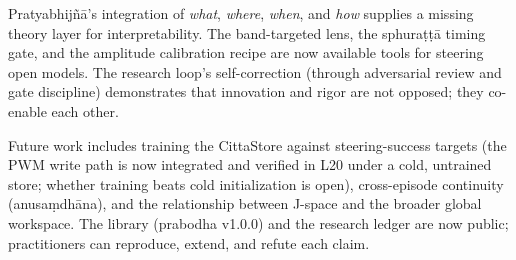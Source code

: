 Pratyabhij\~n\=a's integration of \emph{what}, \emph{where}, \emph{when}, and \emph{how} supplies a missing theory layer
for interpretability.
The band-targeted lens, the sphura\d{t}\d{t}\=a timing gate, and the amplitude calibration recipe are now available tools
for steering open models.
The research loop's self-correction (through adversarial review and gate discipline) demonstrates that innovation
and rigor are not opposed; they co-enable each other.

Future work includes training the CittaStore against steering-success targets (the PWM write path is now integrated and
verified in L20 under a cold, untrained store; whether training beats cold initialization is open), cross-episode
continuity (anusa\d{m}dh\=ana), and the relationship between J-space and the broader global workspace.
The library (prabodha v1.0.0) and the research ledger are now public; practitioners can reproduce, extend, and refute
each claim.
